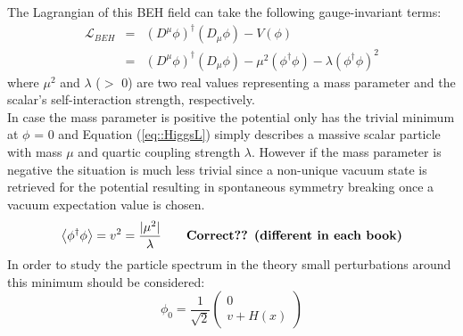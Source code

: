 The Lagrangian of this BEH field can take the following gauge-invariant terms:
\begin{eqnarray} \label{eq::HiggsL}
 \mathcal{L}_{BEH} & = & (D^{\mu} \phi)^{\dagger}(D_{\mu} \phi) - V(\phi) \nonumber \\
                   & = & (D^{\mu} \phi)^{\dagger}(D_{\mu} \phi) - \mu^{2} (\phi^{\dagger} \phi) - \lambda (\phi^{\dagger} \phi)^{2}
\end{eqnarray}
where $\mu^{2}$ and $\lambda$ ($>$ 0) are two real values representing a mass parameter and the scalar's self-interaction strength, respectively.
\\
In case the mass parameter is positive the potential only has the trivial minimum at $\phi$ = 0 and Equation (\ref{eq::HiggsL}) simply describes a massive scalar particle with mass $\mu$ and quartic coupling strength $\lambda$. However if the mass parameter is negative the situation is much less trivial since a non-unique vacuum state is retrieved for the potential resulting in spontaneous symmetry breaking once a vacuum expectation value is chosen.
\begin{equation}
 \left< \phi^{\dagger} \phi \right> = v^{2} = \frac{\vert \mu^{2} \vert}{\lambda} \qquad \textrm{\textbf{Correct?? (different in each book)}}
\end{equation}
In order to study the particle spectrum in the theory small perturbations around this minimum should be considered:
\begin{equation}
 \phi_{0} = \frac{1}{\sqrt{2}}\begin{pmatrix}
             0 \\
             v + H(x)
            \end{pmatrix}
\end{equation}
